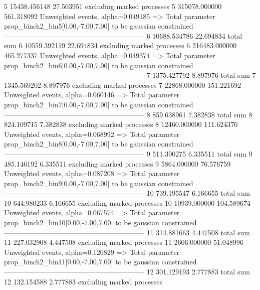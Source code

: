 5          15438.456148    27.503951       excluding marked processes    
5          315078.000000   561.318092      Unweighted events, alpha=0.049185
  => Total parameter prop_binch2_bin5[0.00,-7.00,7.00] to be gaussian constrained
------------------------------------------------------------
6          10688.534786    22.694834       total sum                     
6          10559.392119    22.694834       excluding marked processes    
6          216483.000000   465.277337      Unweighted events, alpha=0.049374
  => Total parameter prop_binch2_bin6[0.00,-7.00,7.00] to be gaussian constrained
------------------------------------------------------------
7          1375.427792     8.897976        total sum                     
7          1345.569202     8.897976        excluding marked processes    
7          22868.000000    151.221692      Unweighted events, alpha=0.060146
  => Total parameter prop_binch2_bin7[0.00,-7.00,7.00] to be gaussian constrained
------------------------------------------------------------
8          859.638961      7.382838        total sum                     
8          824.109715      7.382838        excluding marked processes    
8          12460.000000    111.624370      Unweighted events, alpha=0.068992
  => Total parameter prop_binch2_bin8[0.00,-7.00,7.00] to be gaussian constrained
------------------------------------------------------------
9          511.390275      6.335511        total sum                     
9          485.146192      6.335511        excluding marked processes    
9          5864.000000     76.576759       Unweighted events, alpha=0.087208
  => Total parameter prop_binch2_bin9[0.00,-7.00,7.00] to be gaussian constrained
------------------------------------------------------------
10         739.195547      6.166655        total sum                     
10         644.980233      6.166655        excluding marked processes    
10         10939.000000    104.589674      Unweighted events, alpha=0.067574
  => Total parameter prop_binch2_bin10[0.00,-7.00,7.00] to be gaussian constrained
------------------------------------------------------------
11         314.881663      4.447508        total sum                     
11         227.032908      4.447508        excluding marked processes    
11         2606.000000     51.048996       Unweighted events, alpha=0.120829
  => Total parameter prop_binch2_bin11[0.00,-7.00,7.00] to be gaussian constrained
------------------------------------------------------------
12         301.129193      2.777883        total sum                     
12         132.154588      2.777883        excluding marked processes    
